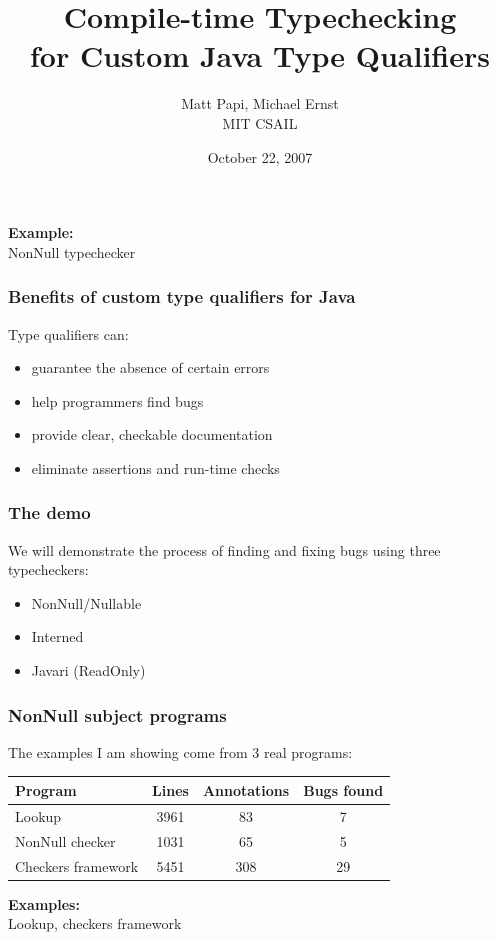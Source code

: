 \documentclass{beamer}
\title{Compile-time Typechecking\\for Custom Java Type Qualifiers}
\author{Matt Papi, Michael Ernst\\MIT CSAIL}
\date{October 22, 2007}
\begin{document}
\frame{\titlepage}

\frame
{
  \begin{center}
  {\bf\large Example:} \\ NonNull typechecker
  \end{center}
}

\frame
{
  \frametitle{Benefits of custom type qualifiers for Java}

  Type qualifiers can:
  \begin{itemize}
  \item guarantee the absence of certain errors
  \item help programmers find bugs
  \item provide clear, checkable documentation
  \item eliminate assertions and run-time checks
  \end{itemize}
}

\frame
{
  \frametitle{The demo}

  We will demonstrate the process of finding and fixing bugs using three
  typecheckers:
  \begin{itemize}
  \item NonNull/Nullable
  \item Interned
  \item Javari (ReadOnly)
  \end{itemize}
}

\setlength{\tabcolsep}{1.5\tabcolsep}
\frame
{
  \frametitle{NonNull subject programs}

  The examples I am showing come from 3 real programs:

  \begin{block}{}
  \begin{tabular}{l|c|c|c}
  \textbf{Program} & 
    \textbf{Lines} & 
    \textbf{Annotations} & 
    \textbf{Bugs found} \\ \hline
  Lookup              & 3961 & 83 & 7 \\ \hline
  NonNull checker     & 1031 & 65 & 5 \\ \hline
  Checkers framework  & 5451 & 308 & 29 
  \end{tabular}
  \end{block}
}

\frame
{
  \begin{center}
  {\bf\large Examples:} \\ Lookup, checkers framework
  \end{center}
}

\end{document}
